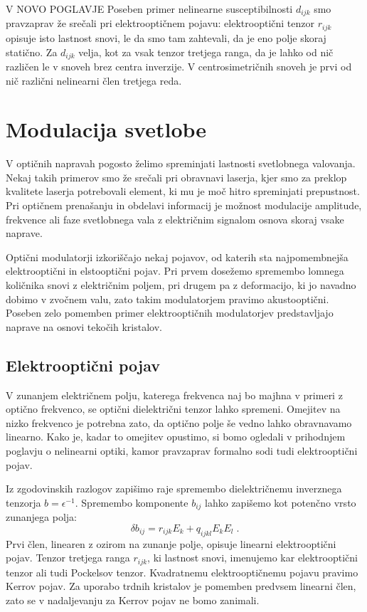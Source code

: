 \documentclass[11pt,fleqn]{book} %
\begin{document}
V NOVO POGLAVJE
Poseben primer nelinearne susceptibilnosti $d_{ijk}$ smo pravzaprav
že srečali pri elektrooptičnem pojavu: elektrooptični tenzor $r_{ijk}$
opisuje isto lastnost snovi, le da smo tam zahtevali, da je eno polje
skoraj statično. Za $d_{ijk}$ velja, kot za vsak tenzor tretjega
ranga, da je lahko od nič različen le v snoveh brez centra inverzije.
V centrosimetričnih snoveh je prvi od nič različni nelinearni člen
tretjega reda.


\chapter{Modulacija svetlobe}

V optičnih napravah pogosto želimo spreminjati lastnosti svetlobnega
valovanja. Nekaj takih primerov smo že srečali pri obravnavi laserja,
kjer smo za preklop kvalitete laserja potrebovali element, ki mu je
moč hitro spreminjati prepustnost. Pri optičnem prenašanju in obdelavi
informacij je možnost modulacije amplitude, frekvence ali faze svetlobnega
vala z električnim signalom osnova skoraj vsake naprave.

Optični modulatorji izkoriščajo nekaj pojavov, od katerih sta najpomembnejša
elektrooptični in elstooptični pojav. Pri prvem dosežemo spremembo
lomnega količnika snovi z električnim poljem, pri drugem pa z deformacijo,
ki jo navadno dobimo v zvočnem valu, zato takim modulatorjem pravimo
akustooptični. Poseben zelo pomemben primer elektrooptičnih modulatorjev
predstavljajo naprave na osnovi tekočih kristalov.


\section{Elektrooptični pojav}

V zunanjem električnem polju, katerega frekvenca naj bo majhna v primeri
z optično frekvenco, se optični dielektrični tenzor lahko spremeni.
Omejitev na nizko frekvenco je potrebna zato, da optično polje še
vedno lahko obravnavamo linearno. Kako je, kadar to omejitev opustimo,
si bomo ogledali v prihodnjem poglavju o nelinearni optiki, kamor
pravzaprav formalno sodi tudi elektrooptični pojav.

Iz zgodovinskih razlogov zapišimo raje spremembo dielektričnemu inverznega
tenzorja $b=\epsilon^{-1}$. Spremembo komponente $b_{ij}$ lahko
zapišemo kot potenčno vrsto zunanjega polja: 
\begin{equation}
\delta b_{ij}=r_{ijk}E_{k}+q_{ijkl}E_{k}E_{l}\;.\label{7.1}
\end{equation}
 Prvi člen, linearen z ozirom na zunanje polje, opisuje linearni elektrooptični
pojav. Tenzor tretjega ranga $r_{ijk}$, ki lastnost snovi, imenujemo
kar elektrooptični tenzor ali tudi Pockelsov tenzor. Kvadratnemu elektrooptičnemu
pojavu pravimo Kerrov pojav. Za uporabo trdnih kristalov je pomemben
predvsem linearni člen, zato se v nadaljevanju za Kerrov pojav ne
bomo zanimali.
\end{document}
